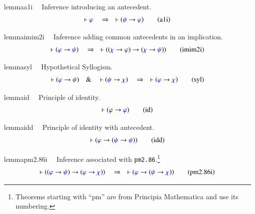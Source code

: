 \begin{restatable}{lemma}{a1i}~~ Inference introducing an antecedent. 
\begin{align}
\vdash \mw{\varphi}\quad\Rightarrow\quad \vdash ( \mw{\psi} \rightarrow
    \mw{\varphi} )\label{eq:a1i}\tag{a1i}
\end{align}
\end{restatable}

\begin{restatable}{lemma}{imim2i}~~ Inference adding common antecedents in an
implication.  
\begin{align}
\vdash ( \mw{\varphi} \rightarrow \mw{\psi} )\quad\Rightarrow\quad \vdash ( (
    \mw{\chi} \rightarrow \mw{\varphi} ) \rightarrow ( \mw{\chi} \rightarrow
    \mw{\psi} ) )\label{eq:imim2i}\tag{imim2i}
\end{align}
\end{restatable}

\begin{restatable}{lemma}{syl}~~ Hypothetical
       Syllogism.  
\begin{align}
\vdash ( \mw{\varphi} \rightarrow \mw{\psi} )\quad\&\quad \vdash ( \mw{\psi}
    \rightarrow \mw{\chi} )\quad\Rightarrow\quad \vdash ( \mw{\varphi}
    \rightarrow \mw{\chi} )\label{eq:syl}\tag{syl}
\end{align}
\end{restatable}

\begin{restatable}{lemma}{id}~~ Principle of identity.  
\begin{align}
\vdash ( \mw{\varphi} \rightarrow \mw{\varphi} )\label{eq:id}\tag{id}
\end{align}
\end{restatable}

\begin{restatable}{lemma}{idd}~~ Principle of identity with antecedent.
\begin{align}
\vdash ( \mw{\varphi} \rightarrow ( \mw{\psi} \rightarrow \mw{\psi} )
    )\label{eq:idd}\tag{idd}
\end{align}
\end{restatable}

\begin{restatable}{lemma}{pm2.86i}~~ Inference associated with {\tt pm2.86}.\footnote{Theorems starting with ``pm''
are from Principia Mathematica and use its numbering.} 
\begin{align}
\vdash ( ( \mw{\varphi} \rightarrow \mw{\psi} ) \rightarrow ( \mw{\varphi}
    \rightarrow \mw{\chi} ) )\quad\Rightarrow\quad \vdash ( \mw{\varphi}
    \rightarrow ( \mw{\psi} \rightarrow \mw{\chi} )
    )\label{eq:pm2.86i}\tag{pm2.86i}
\end{align}
\end{restatable}

